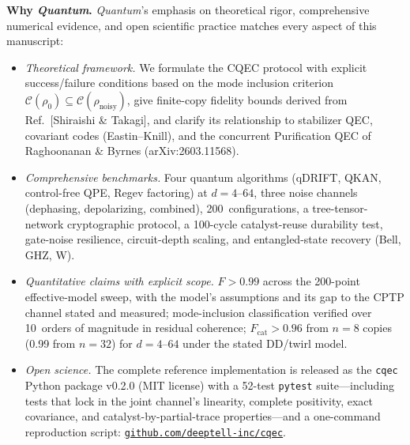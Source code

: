 \documentclass[11pt,a4paper]{article}
\begin{document}
\textbf{Why \emph{Quantum}.}
\emph{Quantum}'s emphasis on theoretical rigor, comprehensive numerical evidence, and open scientific practice matches every aspect of this manuscript:
\begin{itemize}
\item \emph{Theoretical framework.}
We formulate the CQEC protocol with explicit success/failure conditions based on the mode inclusion criterion $\mathcal{C}(\rho_{0}) \subseteq \mathcal{C}(\rho_\mathrm{noisy})$, give finite-copy fidelity bounds derived from Ref.\ [Shiraishi \& Takagi], and clarify its relationship to stabilizer QEC, covariant codes (Eastin--Knill), and the concurrent Purification QEC of Raghoonanan \& Byrnes (arXiv:2603.11568).
\item \emph{Comprehensive benchmarks.}
Four quantum algorithms (qDRIFT, QKAN, control-free QPE, Regev factoring) at $d = 4$--$64$, three noise channels (dephasing, depolarizing, combined), 200~configurations, a tree-tensor-network cryptographic protocol, a 100-cycle catalyst-reuse durability test, gate-noise resilience, circuit-depth scaling, and entangled-state recovery (Bell, GHZ, W).
\item \emph{Quantitative claims with explicit scope.}
$F > 0.99$ across the 200-point effective-model sweep, with the model's assumptions and its gap to the CPTP channel stated and measured; mode-inclusion classification verified over 10~orders of magnitude in residual coherence; $F_\mathrm{cat} > 0.96$ from $n = 8$ copies (0.99 from $n = 32$) for $d = 4$--$64$ under the stated DD/twirl model.
\item \emph{Open science.}
The complete reference implementation is released as the \texttt{cqec} Python package v0.2.0 (MIT license) with a 52-test \texttt{pytest} suite---including tests that lock in the joint channel's linearity, complete positivity, exact covariance, and catalyst-by-partial-trace properties---and a one-command reproduction script: \href{https://github.com/deeptell-inc/cqec}{\texttt{github.com/deeptell-inc/cqec}}.
\end{itemize}

\medskip
\end{document}
